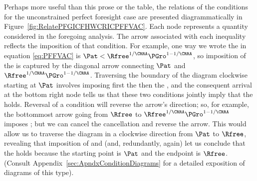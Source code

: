 \documentclass[BufferStockTheory]{subfiles}
\begin{document}
Perhaps more useful than this prose or the table,  the relations of the conditions for the unconstrained perfect foresight case are presented diagrammatically in Figure~\ref{fig:RelatePFGICFHWCRICPFFVAC}.  Each node represents a quantity considered in the foregoing analysis.  The arrow associated with each inequality reflects the imposition of that condition.  For example, one way we wrote the {\PFFVAC} in equation \eqref{eq:PFFVAC} is $\Pat < \Rfree^{1/\CRRA} \PGro^{1-1/\CRRA}$, so imposition of the {\PFFVAC} is captured by the diagonal arrow connecting $\Pat$ and $\Rfree^{1/\CRRA}\PGro^{1-1/\CRRA}$.  Traversing the boundary of the diagram clockwise starting at $\Pat$ involves imposing first the {\GICRaw} then the {\FHWC}, and the consequent arrival at the bottom right node tells us that these two conditions jointly imply that the {\PFFVAC} holds.  Reversal of a condition will reverse the arrow's direction; so, for example, the bottommost arrow going from $\Rfree$ to $\Rfree^{1/\CRRA}\PGro^{1-1/\CRRA}$ imposes {\cncl{\FHWC}}; but we can cancel the cancellation and reverse the arrow.  This would allow us to traverse the diagram in a clockwise direction from $\Pat$ to $\Rfree$, revealing that imposition of {\GICRaw} and {\FHWC} (and, redundantly, {\FHWC} again) let us conclude that the {\RIC} holds because the starting point is $\Pat$ and the endpoint is $\Rfree$.  (Consult Appendix~\ref{sec:ApndxConditionDiagrams} for a detailed exposition of diagrams of this type).



\begin{comment}
\begin{align}
  \DiscFac \Pat^{1-\CRRA} & < 1
\\ \DiscFac \Rfree \Pat^{1-\CRRA} & < \Rfree  
\\ (\DiscFac \Rfree)^{1/\CRRA} \Pat^{1/\CRRA-1} & < (\Rfree)^{1/\CRRA}
\\ \Pat^{1/\CRRA} & < (\Rfree)^{1/\CRRA}
\\ \Pat/\Rfree & < 1
\end{align}
\begin{align}
  \left(\frac{1-(\Rfree \DiscFac)^{1/\CRRA}/\Rfree}{1-\DiscFac (\DiscFac \Rfree)^{1/\CRRA-1}}\right)
  
\end{align}

\begin{align}
1/\Rfree & ? \DiscFac (\DiscFac \Rfree)^{-1}
1/\DiscFac\Rfree & ?  (\DiscFac \Rfree)^{-1}
\end{align}
\end{comment}
\end{document}
